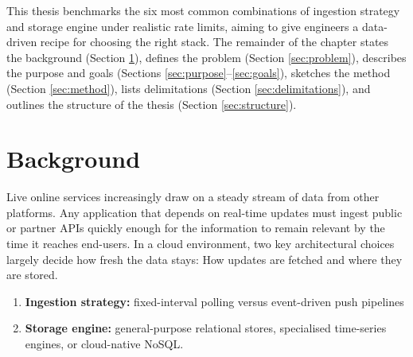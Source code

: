 \documentclass[nomenclature, english, biblatex]{kththesis}
\numberwithin{listing}{chapter}
\begin{document}
This thesis benchmarks the six most common combinations of ingestion strategy and storage engine under realistic rate limits, aiming to give engineers a data-driven recipe for choosing the right stack.  
The remainder of the chapter states the background (Section \ref{sec:background}), defines the problem (Section \ref{sec:problem}), describes the purpose and goals (Sections \ref{sec:purpose}–\ref{sec:goals}), sketches the method (Section \ref{sec:method}), lists delimitations (Section \ref{sec:delimitations}), and outlines the structure of the thesis (Section \ref{sec:structure}).




\section{Background}
\label{sec:background}
Live online services increasingly draw on a steady stream of data from other platforms. Any application that depends on real-time updates must ingest public or partner \glspl{API} quickly enough for the information to remain relevant by the time it reaches end-users. In a cloud environment, two key architectural choices largely decide how fresh the data stays: How updates are fetched and where they are stored.

\begin{enumerate}
    \item \textbf{Ingestion strategy:} fixed-interval polling versus event-driven push pipelines
    \item \textbf{Storage engine:} general-purpose relational stores, specialised time-series engines, or cloud-native NoSQL.
\end{enumerate}

\end{document}
